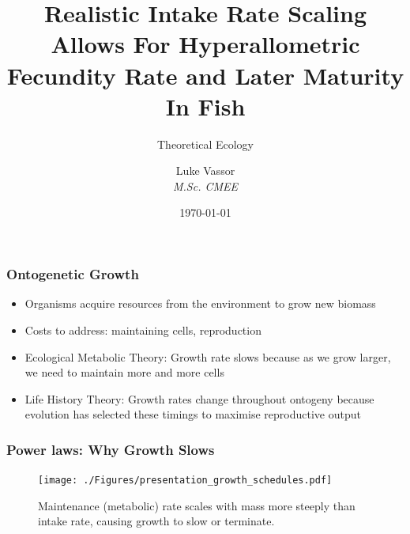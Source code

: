 \documentclass[handout]{beamer}
\institute{\texttt{[image: logo.png]}}
\title{Realistic Intake Rate Scaling Allows For Hyperallometric Fecundity Rate and Later Maturity In Fish}
\subtitle{Theoretical Ecology}
\author{Luke Vassor \\ \textit{M.Sc. CMEE}}
\date{\today}
\begin{document}
 
\frame{\titlepage}


\begin{frame}
	\frametitle{Ontogenetic Growth}
	\begin{itemize}
		\item Organisms acquire resources from the environment to grow new biomass
		\item Costs to address: maintaining cells, reproduction
		\item Ecological Metabolic Theory: Growth rate slows because as we grow larger, we need to maintain more and more cells
		\item Life History Theory: Growth rates change throughout ontogeny because evolution has selected these timings to maximise reproductive output
	\end{itemize}

			
\end{frame}


\begin{frame}
	\frametitle{Power laws: Why Growth Slows}
		\centering
		\begin{figure}
			\texttt{[image: ./Figures/presentation\_growth\_schedules.pdf]} \
			\caption{Maintenance (metabolic) rate scales with mass more steeply than intake rate, causing growth to slow or terminate.}
		\end{figure}
\end{frame}
\end{document}
